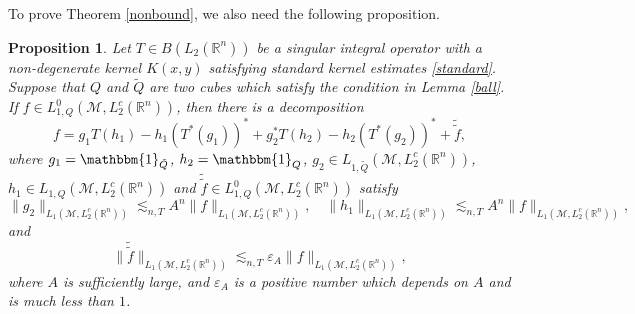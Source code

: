 \documentclass[oneside,english,a4wide]{amsart}
\numberwithin{equation}{section}
\numberwithin{figure}{section}
\theoremstyle{plain}
\theoremstyle{plain}
\newtheorem{proposition}[thm]{Proposition}
\theoremstyle{definition}
\theoremstyle{plain}
\theoremstyle{remark}
\theoremstyle{definition}
\theoremstyle{remark}
\theoremstyle{definition}
\newcommand{\8}{\infty}
\begin{document}
To prove Theorem \ref{nonbound}, we also need the following proposition.

\begin{proposition}\label{nondecom2}
	Let $T\in B(L_2(\mathbb{R}^n))$ be a singular integral operator with a non-degenerate kernel $K(x,y)$ satisfying standard kernel estimates \eqref{standard}. Suppose that $Q$ and $\tilde{Q}$ are two cubes which satisfy the condition in Lemma \ref{ball}. If $f\in 	L^0_{1,Q}(\mathcal{M},L_2^c(\mathbb{R}^n))$, then there is a decomposition
	\begin{equation*}
		f=g_1T(h_1)-h_1(T^*(g_1))^*+ g_2^*T(h_2)-h_2(T^*(g_2))^*+\tilde{\tilde{f}},
	\end{equation*}
	where $g_1=\mathbbm{1}_{\tilde{Q}}$, $h_2=\mathbbm{1}_{{Q}}$, $g_2\in L_{1,\tilde{Q}}(\mathcal{M},L_2^c(\mathbb{R}^n))$, $h_1\in L_{1,Q}(\mathcal{M},L_2^c(\mathbb{R}^n))$ and $\tilde{\tilde{f}}\in L^0_{1,Q}(\mathcal{M},L_2^c(\mathbb{R}^n))$ satisfy
	\begin{equation}\label{g2h1f}
		\|g_2\|_{L_{1}(\mathcal{M},L_2^c(\mathbb{R}^n))}\lesssim_{n,T} A^n\|f\|_{L_{1}(\mathcal{M},L_2^c(\mathbb{R}^n))},\quad \|h_1\|_{L_{1}(\mathcal{M},L_2^c(\mathbb{R}^n))}\lesssim_{n,T} A^n\|f\|_{L_{1}(\mathcal{M},L_2^c(\mathbb{R}^n))},
	\end{equation}
    and
    \begin{equation}\label{titif}
       \|\tilde{\tilde{f}}\|_{L_{1}(\mathcal{M},L_2^c(\mathbb{R}^n))}\lesssim_{n,T} \varepsilon_A\|f\|_{L_{1}(\mathcal{M},L_2^c(\mathbb{R}^n))},
    \end{equation}
	where $A$ is sufficiently large, and $\varepsilon_A$ is a positive number which depends on $A$ and is much less than $1$.
\end{proposition}
\end{document}

